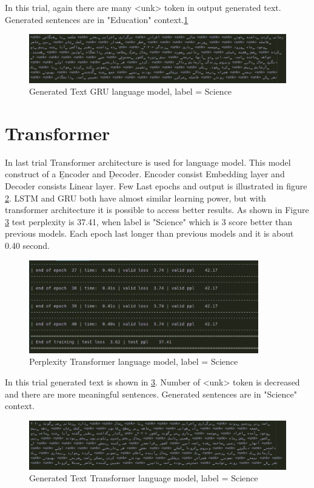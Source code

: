 In this trial, again there are many <unk> token in output generated text. Generated sentences are in "Education" context.\ref{fig:gru_edu_out}

\begin{figure}
	\centering
	\includegraphics[width=15cm]{images/gru_danesh_out.png}
	\caption{Generated Text GRU language model, label = Science}
	\label{fig:gru_edu_out}
\end{figure}

\section{Transformer}
In last trial Transformer architecture is used for language model. This model construct of a \b{Encoder} and \b{Decoder}. Encoder consist Embedding layer and Decoder consists Linear layer. Few Last epochs and output is illustrated in figure \ref{fig:transformer_edu}. LSTM and GRU both have almost similar learning power, but with transformer architecture it is possible to access better results. As shown in Figure \ref{fig:transformer_edu_out} test perplexity is 37.41, when label is "Science" which is 3 score better than previous models. Each epoch last longer than previous models and it is about 0.40 second.
 
\begin{figure}
	\centering
	\includegraphics[width=10cm]{images/transformer_danesh.png}
	\caption{Perplexity Transformer language model, label = Science}
	\label{fig:transformer_edu}
\end{figure}

In this trial generated text is shown in \ref{fig:transformer_edu_out}. Number of <unk> token is decreased and there are more meaningful sentences. Generated sentences are in "Science" context.
\begin{figure}
	\centering
	\includegraphics[width=15cm]{images/transformer_danesh_out.png}
	\caption{Generated Text Transformer language model, label = Science}
	\label{fig:transformer_edu_out}
\end{figure}

